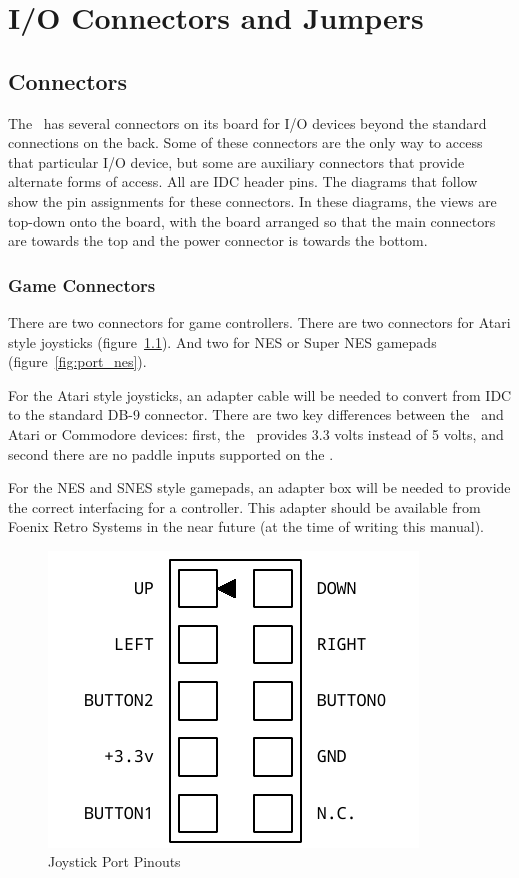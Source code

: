 \chapter{I/O Connectors and Jumpers}

\section*{Connectors}

The \jr\ has several connectors on its board for I/O devices beyond the standard connections on the back. Some of these connectors are the only way to access that particular I/O device, but some are auxiliary connectors that provide alternate forms of access. All are IDC header pins. The diagrams that follow show the pin assignments for these connectors. In these diagrams, the views are top-down onto the board, with the board arranged so that the main connectors are towards the top and the power connector is towards the bottom.

\subsection*{Game Connectors}

There are two connectors for game controllers. There are two connectors for Atari style joysticks (figure~\ref{fig:port_joy}). And two for NES or Super NES gamepads (figure~\ref{fig:port_nes}).

For the Atari style joysticks, an adapter cable will be needed to convert from IDC to the standard DB-9 connector. There are two key differences between the \jr\ and Atari or Commodore devices: first, the \jr\ provides 3.3 volts instead of 5 volts, and second there are no paddle inputs supported on the \jr.

For the NES and SNES style gamepads, an adapter box will be needed to provide the correct interfacing for a controller. This adapter should be available from Foenix Retro Systems in the near future (at the time of writing this manual).

\begin{figure}[ht]
    \begin{center}
        \includegraphics[scale=0.65]{images/f256_port_joystick.pdf}
    \end{center}
    \caption{Joystick Port Pinouts}
    \label{fig:port_joy}
\end{figure}

